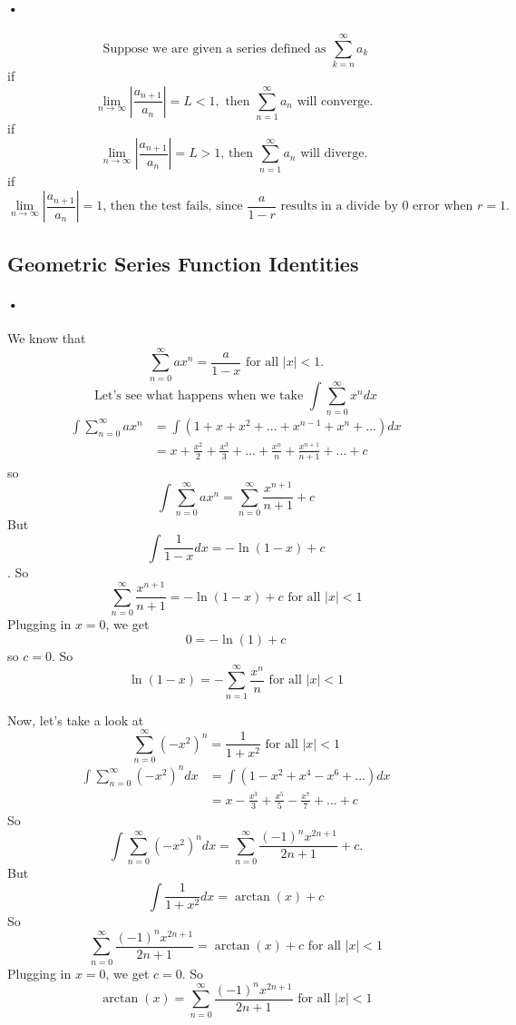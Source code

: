 \documentclass[font =22]{report}
\begin{document}
\paragraph{•}

\[
\text{Suppose we are given a series defined as }\sum_{k=n}^\infty a_k
\]
if 
\[
\lim_{n\to\infty} \left\lvert \frac{a_{n+1}}{a_n} \right\rvert= L < 1, \text{ then } \sum_{n=1}^\infty a_n \text{ will converge. }
\]
if 
\[
\lim_{n\to\infty} \left\lvert \frac{a_{n+1}}{a_n} \right\rvert = L> 1 \text{, then } \sum_{n=1}^\infty a_n \text{ will diverge. }
\]
if 
\[
\lim_{n\to\infty} \left\lvert \frac{a_{n+1}}{a_n} \right\rvert =  1 \text{, then the test fails, since } \frac{a}{1-r} \text{ results in a divide by 0 error when } r = 1. 
\]
\subsection*{Geometric Series Function Identities}
\paragraph{•}
We know that 
\[
\sum_{n = 0}^\infty ax^n = \frac{a}{1-x}  \text{ for all } |x|<1.
\]
\[
\text{Let's see what happens when we take } \int\sum_{n = 0}^\infty x^n dx
\]
\begin{align*}
\int\sum_{n = 0}^\infty ax^n  &= \int(1+x+x^2+...+x^{n-1}+x^n+...)dx\\
&=x+\frac{x^2}{2}+\frac{x^3}{3}+...+\frac{x^n}{n}+\frac{x^{n+1}}{n+1}+...+c
\end{align*}
so 
\[
\int\sum_{n = 0}^\infty ax^n = \sum_{n=0}^\infty \frac{x^{n+1}}{n+1} + c 
\]
But  $$\int \frac{1}{1-x}dx = -\ln(1-x)+c$$.
So
\[
\sum_{n=0}^\infty \frac{x^{n+1}}{n+1} = -\ln(1-x) + c \text{ for all } |x|<1
\]
Plugging in $x=0$, we get 
\[
0 = -\ln(1) + c
\]
so $c=0$. So 
\[
\ln(1-x) = -\sum_{n=1}^\infty \frac{x^{n}}{n} \text{ for all } |x|<1
\]
\newline
\newline

Now, let's take a look at 
\[
\sum_{n=0}^\infty (-x^2)^n = \frac{1}{1+x^2} \text{ for all } |x|<1 
\]
\begin{align*}
\int\sum_{n=0}^\infty (-x^2)^ndx &= \int(1-x^2+x^4-x^6+...)dx\\
&= x-\frac{x^3}{3}+\frac{x^5}{5}-\frac{x^7}{7}+...+c 
\end{align*}
So 
\[
\int\sum_{n=0}^\infty (-x^2)^ndx = \sum_{n=0}^\infty \frac{(-1)^nx^{2n+1}}{2n+1} + c.
\]
But
\[
\int \frac{1}{1+x^2}dx = \arctan(x) + c
\]
So
\[
\sum_{n=0}^\infty \frac{(-1)^nx^{2n+1}}{2n+1} = \arctan(x) + c \text{ for all } |x|<1
\]
Plugging in $x=0$, we get $c=0$. So 
\[
\arctan(x)=\sum_{n=0}^\infty \frac{(-1)^nx^{2n+1}}{2n+1}  \text{ for all } |x|<1
\]
\end{document}
